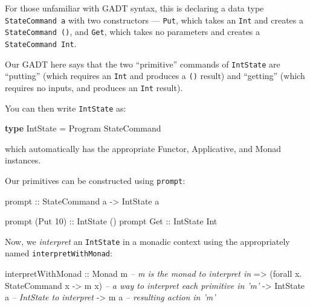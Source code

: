 \documentclass[]{article}
\newenvironment{Shaded}{}{}
\newcommand{\CommentTok}[1]{\textcolor[rgb]{0.38,0.63,0.69}{\textit{#1}}}
\newcommand{\DataTypeTok}[1]{\textcolor[rgb]{0.56,0.13,0.00}{#1}}
\newcommand{\DecValTok}[1]{\textcolor[rgb]{0.25,0.63,0.44}{#1}}
\newcommand{\FunctionTok}[1]{\textcolor[rgb]{0.02,0.16,0.49}{#1}}
\newcommand{\KeywordTok}[1]{\textcolor[rgb]{0.00,0.44,0.13}{\textbf{#1}}}
\newcommand{\NormalTok}[1]{#1}
\newcommand{\OtherTok}[1]{\textcolor[rgb]{0.00,0.44,0.13}{#1}}
\begin{document}
For those unfamiliar with GADT syntax, this is declaring a data type
\texttt{StateCommand\ a} with two constructors --- \texttt{Put}, which takes an
\texttt{Int} and creates a \texttt{StateCommand\ ()}, and \texttt{Get}, which
takes no parameters and creates a \texttt{StateCommand\ Int}.

Our GADT here says that the two ``primitive'' commands of \texttt{IntState} are
``putting'' (which requires an \texttt{Int} and produces a \texttt{()} result)
and ``getting'' (which requires no inputs, and produces an \texttt{Int} result).

You can then write \texttt{IntState} as:

\begin{Shaded}
\begin{Highlighting}[]
\KeywordTok{type} \DataTypeTok{IntState} \FunctionTok{=} \DataTypeTok{Program} \DataTypeTok{StateCommand}
\end{Highlighting}
\end{Shaded}

which automatically has the appropriate Functor, Applicative, and Monad
instances.

Our primitives can be constructed using \texttt{prompt}:

\begin{Shaded}
\begin{Highlighting}[]
\OtherTok{prompt ::} \DataTypeTok{StateCommand}\NormalTok{ a }\OtherTok{->} \DataTypeTok{IntState}\NormalTok{ a}

\NormalTok{prompt (}\DataTypeTok{Put} \DecValTok{10}\NormalTok{)}\OtherTok{ ::} \DataTypeTok{IntState}\NormalTok{ ()}
\NormalTok{prompt }\DataTypeTok{Get}\OtherTok{      ::} \DataTypeTok{IntState} \DataTypeTok{Int}
\end{Highlighting}
\end{Shaded}

Now, we \emph{interpret} an \texttt{IntState} in a monadic context using the
appropriately named \texttt{interpretWithMonad}:

\begin{Shaded}
\begin{Highlighting}[]
\NormalTok{interpretWithMonad}
\OtherTok{    ::} \DataTypeTok{Monad}\NormalTok{ m                              }\CommentTok{-- m is the monad to interpret in}
    \OtherTok{=>}\NormalTok{ (forall x}\FunctionTok{.} \DataTypeTok{StateCommand}\NormalTok{ x }\OtherTok{->}\NormalTok{ m x)    }\CommentTok{-- a way to interpret each primitive in 'm'}
    \OtherTok{->} \DataTypeTok{IntState}\NormalTok{ a                           }\CommentTok{-- IntState to interpret}
    \OtherTok{->}\NormalTok{ m a                                  }\CommentTok{-- resulting action in 'm'}
\end{Highlighting}
\end{Shaded}
\end{document}
